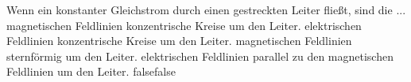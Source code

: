     {Wenn ein konstanter Gleichstrom durch einen gestreckten Leiter fließt, sind die ...}
    {magnetischen Feldlinien konzentrische Kreise um den Leiter.}
    {elektrischen Feldlinien konzentrische Kreise um den Leiter.}
    {magnetischen Feldlinien sternförmig um den Leiter.}
    {elektrischen Feldlinien parallel zu den magnetischen Feldlinien um den Leiter.}
    {false}{false}